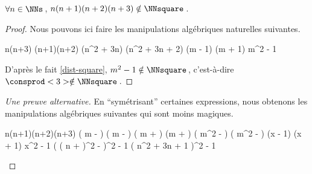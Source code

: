 \begin{fact} \label{case-3}
	 $\forall n \in \NNs$\,, $n(n+1)(n+2)(n+3) \notin \NNsquare$\,.
\end{fact}




\begin{proof}
    Nous pouvons ici faire les manipulations algébriques naturelles suivantes.
    
    \medskip
    
    \begin{stepcalc}[style = sar]
    \explnext{}
    	n(n+3) \cdot (n+1)(n+2)
    \explnext{}
    	(n^2 + 3n) \cdot (n^2 + 3n + 2)
    	(m - 1) (m + 1)
    \explnext{}
    	m^2 - 1
    \end{stepcalc}
    
    \medskip
    
    D'après le fait \ref{dist-square}, $m^2 - 1 \notin \NNsquare$\,, c'est-à-dire $\consprod<3> \notin \NNsquare$\,. 
\end{proof}




\begin{proof}[Une preuve alternative]
	En \enquote{symétrisant} certaines expressions, nous obtenons les manipulations algébriques suivantes qui sont moins magiques.
    
    \medskip
    
    \begin{stepcalc}[style = sar]
    \explnext{}
    	n(n+1)(n+2)(n+3)
    	\big( m -  \big) \big( m -  \big) \big( m +  \big) \big(m +  \big)
    \explnext{}
    	\big( m^2 -  \big) \big( m^2 -  \big)
    	(x - 1) (x + 1)
    \explnext{}
    	x^2 - 1
    \explnext{}
    	\Big( \big( n +  \big)^2 -  \Big)^2 - 1
    \explnext{}
    	\big( n^2 + 3n + 1 \big)^2 - 1
    \end{stepcalc}

	\vspace{-2ex}	
	\leavevmode
\end{proof}







